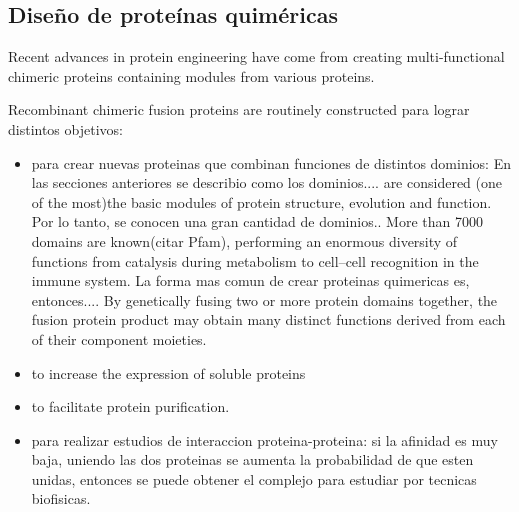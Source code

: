\subsection{Diseño de proteínas quiméricas}


Recent advances in protein engineering have come from creating multi-functional chimeric proteins containing modules from various proteins.


Recombinant chimeric fusion proteins are routinely constructed para lograr distintos objetivos: 
\begin{itemize}
 \item para crear nuevas proteinas que combinan funciones de distintos dominios:
En las secciones anteriores se describio como los dominios.... are considered (one of the most)the basic modules of protein structure, evolution and function.
Por lo tanto, se conocen una gran cantidad de dominios..
More than 7000 domains are known(citar Pfam), performing an enormous diversity of functions from catalysis during metabolism to cell–cell recognition in the immune system. 
La forma mas comun de crear proteinas quimericas es, entonces....
By genetically fusing two or more protein domains together, the fusion protein product may obtain many distinct functions derived from each of their component moieties.
 
\item to increase the expression of soluble proteins 

\item to facilitate protein purification.
\item para realizar estudios de interaccion proteina-proteina: si la afinidad es muy baja, uniendo las dos proteinas se aumenta la probabilidad de que esten unidas, entonces se puede obtener el complejo para estudiar por tecnicas biofisicas.


\end{itemize}
